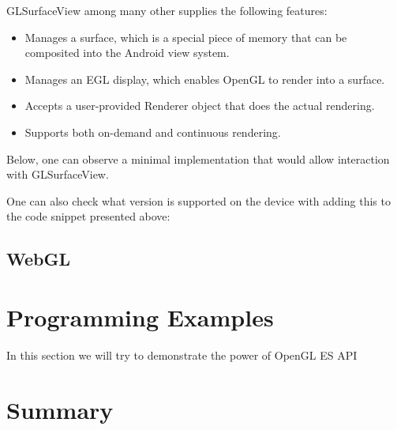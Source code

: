 \documentclass[a4paper,11pt]{article}
\renewenvironment{abstract}
{\itshape \small
  \begin{center}
  \bfseries \abstractname\vspace{-.5em}\vspace{0pt}
  \end{center}
  \list{}{
    \setlength{\leftmargin}{1.5cm}%
    \setlength{\rightmargin}{\leftmargin}%
  }%
  \item\relax}
{\endlist}
\begin{document}
\begin{abstract}
GLSurfaceView among many other supplies the following features:
\begin{itemize}
\item Manages a surface, which is a special piece of memory that can be composited into the Android view system.
\item Manages an EGL display, which enables OpenGL to render into a surface.
\item Accepts a user-provided Renderer object that does the actual rendering.
\item Supports both on-demand and continuous rendering.
\end{itemize}

Below, one can observe a minimal implementation that would allow interaction with GLSurfaceView.



One can also check what version is supported on the device with adding this to the code snippet presented above:





\pagebreak[3] 
\subsection{WebGL}


\clearpage 
\section{Programming Examples} 

In this section we will try to demonstrate the power of OpenGL ES API 




\section{Summary} 


\clearpage
\label{Bibliography} 
%

\footnotesize{  }
\end{document}
